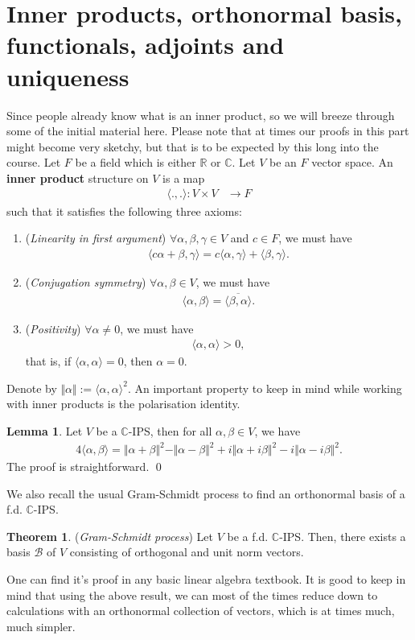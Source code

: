 \documentclass[letterpaper,11pt,twoside]{article}
\theoremstyle{definition}
\theoremstyle{definition}
\newtheorem{theorem}[proposition]{Theorem}
\theoremstyle{definition}
\theoremstyle{definition}
\newtheorem{lemma}[proposition]{\textbf{Lemma}}
\theoremstyle{definition}
\theoremstyle{definition}
\theoremstyle{remark}
\theoremstyle{definition}
\newcommand{\R}[0]{\mathbb{R}}
\newcommand{\ip}[2]{\langle #1,#2 \rangle}
\newcommand{\norm}[1]{\Vert #1 \Vert}
\newcommand{\conj}[1]{\overline{#1}}
\newcommand{\C}{\mathbb{C}}
\begin{document}
	\section{Inner products, orthonormal basis, functionals, adjoints and uniqueness}
	Since people already know what is an inner product, so we will breeze through some of the initial material here. Please note that at times our proofs in this part might become very sketchy, but that is to be expected by this long into the course. Let $ F $ be a field which is either $ \R $ or $ \mathbb{C} $. Let $ V $ be an $ F $ vector space. An \textbf{inner product} structure on $ V $ is a map
	\begin{align*}
		\ip{.}{.} : V\times V &\longrightarrow F
	\end{align*}
    such that it satisfies the following three axioms:
    \begin{enumerate}
    	\item {(\textit{Linearity in first argument}) $ \forall  \alpha,\beta,\gamma\in V$ and $ c\in F $, we must have
    \begin{align*}
    	\ip{c\alpha + \beta}{\gamma} =c\ip{\alpha}{\gamma} + \ip{\beta}{\gamma}.
    \end{align*}	
    }
    	\item {(\textit{Conjugation symmetry}) $ \forall \alpha,\beta\in V $, we must have
    \begin{align*}
    	\ip{\alpha}{\beta} = \conj{\ip{\beta}{\alpha}}.
    \end{align*}	
    }
	\item {(\textit{Positivity}) $ \forall \alpha\neq 0 $, we must have
\begin{align*}
	\ip{\alpha}{\alpha} > 0,
\end{align*}	
	that is, if $ \ip{\alpha}{\alpha} = 0 $, then $ \alpha = 0 $.
}
    \end{enumerate}
    Denote by $ \norm{\alpha} := \ip{\alpha}{\alpha}^{2} $. An important property to keep in mind while working with inner products is the polarisation identity.
   \begin{lemma}\label{L-4.0.1}
   		Let $ V $ be a $ \C $-IPS, then for all $ \alpha,\beta\in V $, we have
   		\begin{align*}
   			4\ip{\alpha}{\beta} = \norm{\alpha+\beta}^{2} - \norm{\alpha-\beta}^{2} + i\norm{\alpha+i\beta}^{2} - i\norm{\alpha-i\beta}^{2}.
   		\end{align*}	
   	The proof is straightforward. \qed
   \end{lemma}
	We also recall the usual Gram-Schmidt process to find an orthonormal basis of a f.d. $ \C $-IPS.
	\begin{theorem}\label{T-4.0.2}
		(\textit{Gram-Schmidt process}) Let $ V $ be a f.d. $ \C $-IPS. Then, there exists a basis $ \mathcal{B} $ of $ V $ consisting of orthogonal and unit norm vectors.
	\end{theorem}
    One can find it's proof in any basic linear algebra textbook. It is good to keep in mind that using the above result, we can most of the times reduce down to calculations with an orthonormal collection of vectors, which is at times much, much simpler.
\end{document}

